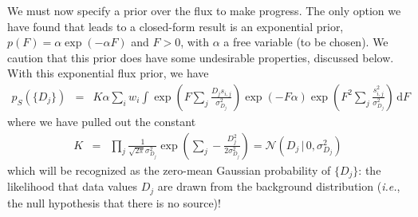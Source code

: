 \documentclass[11pt,letterpaper,linenumbers]{aastex63}
\newcommand{\latin}[1]{\emph{#1}}
\newcommand{\ie}{\latin{i.e.}}
\newcommand{\gaussianN}{\mathcal{N}}
\newcommand{\gaussian}[1]{\gaussianN\!\left(#1\right)}
\newcommand{\dd}{\mathrm{d}}
\begin{document}
We must now specify a prior over the flux to make progress.  The only
option we have found that leads to a closed-form result is an exponential prior,
$p(F) = \alpha \exp(-\alpha F)$ and $F > 0$, with $\alpha$ a free
variable (to be chosen).  We caution that this prior does have some
undesirable properties, discussed below.  With this exponential flux
prior, we have
\begin{eqnarray}
  p_S(\{ D_j \})
  &=&
  K \alpha
  \sum_i w_i 
  \int 
    \exp{ \left( F \sum_j \frac{D_j s_{i,j}}{\sigma_{D_j}^2} \right)}
    \exp{ \left( -F \alpha \right)}
    \exp{ \left( F^2 \sum_j \frac{s_{i,j}^2}{\sigma_{D_j}^2} \right)}
    \, \dd F
\end{eqnarray}
where we have pulled out the constant
\begin{eqnarray}
K &=& \prod_j \frac{1}{\sqrt{2 \pi} \sigma_{D_j}^2} 
\exp{\left( \sum_j -\frac{D_j^2}{2 \sigma_{D_j}^2} \right)}
= \gaussian{D_j \,|\, 0, \sigma_{D_j}^2}
\label{eq:pbg}
\end{eqnarray}
which will be recognized as the zero-mean Gaussian probability of
$\{D_j\}$: the likelihood that data values $D_j$ are drawn from the
background distribution (\ie, the null hypothesis that there is no
source)!
\end{document}
